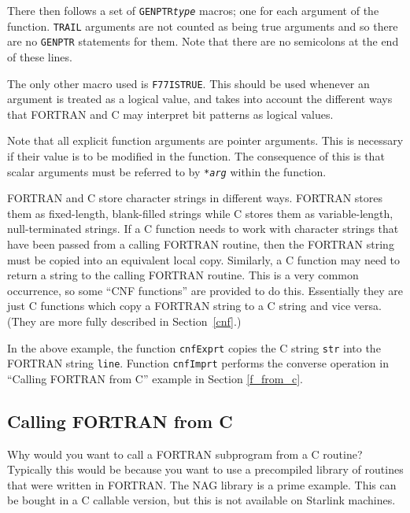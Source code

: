 \documentclass[twoside,11pt]{article}
\newcommand{\htmlref}[2]{#1}
\newcommand{\latex}[1]{#1}
\newcommand{\xlabel}[1]{}
\renewcommand{\_}{\texttt{\symbol{95}}}
\begin{document}
There then follows a set of \texttt{GENPTR\_\-\textit{type}}\/ macros; one 
for each argument of the function. \texttt{TRAIL} arguments are not counted as 
being true arguments and so there are no \texttt{GENPTR} statements for them. 
Note that there are no semicolons at the end of these lines.

The only other macro used is \texttt{F77\_\-ISTRUE}. 
This should be used whenever an argument is treated as a logical value, and 
takes into account the different ways that FORTRAN and C may interpret bit 
patterns as logical values.

Note that all explicit function arguments are pointer arguments. This is
necessary if their value is to be modified in the function. The consequence of
this is that scalar arguments must be referred to by \texttt{*\textit{arg}}\/
within the function.

FORTRAN and C store character strings in different ways. FORTRAN stores them as
fixed-length, blank-filled strings while C stores them as variable-length, 
null-terminated strings. 
If a C function needs to work with character strings that
have been passed from a calling FORTRAN routine, then the FORTRAN string must
be copied into an equivalent local copy. Similarly, a C function may need to
return a string to the calling FORTRAN routine. This is a very common
occurrence, so some
\htmlref{``CNF functions''}{cnf}
are provided to do this.
Essentially they are just C functions which copy a FORTRAN string to a C 
string and vice versa. 
\latex{(They are more fully described in Section~\ref{cnf}.)}

In the above example, the function \texttt{cnfExprt} copies the C string 
\texttt{str} into the FORTRAN string \texttt{line}. Function \texttt{cnfImprt}
performs the converse operation in
\htmlref{``Calling FORTRAN from C''
example}{cook_argsc2f}\latex{ in Section \ref{f_from_c}}.

\subsection{\xlabel{calling_fortran_from_c}\label{f_from_c}Calling FORTRAN from C}

Why would you want to call a FORTRAN subprogram from a C routine? Typically
this would be because you want to use a precompiled library of routines that
were written in FORTRAN\@. The NAG library is a prime example. 
This can be bought in a C callable version, but this is not available on 
Starlink machines.
\end{document}

